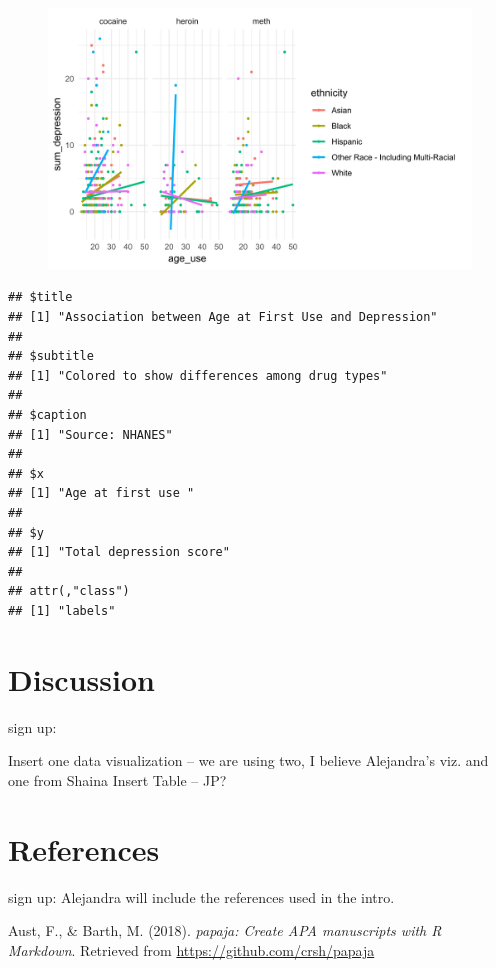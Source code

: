 \documentclass[man]{apa6}
\begin{document}
\begin{figure}
\centering
\includegraphics{Final_Paper_Group_3_files/figure-latex/ST_plot1-1.svg}
\caption{}
\end{figure}

\begin{verbatim}
## $title
## [1] "Association between Age at First Use and Depression"
## 
## $subtitle
## [1] "Colored to show differences among drug types"
## 
## $caption
## [1] "Source: NHANES"
## 
## $x
## [1] "Age at first use "
## 
## $y
## [1] "Total depression score"
## 
## attr(,"class")
## [1] "labels"
\end{verbatim}

\section{Discussion}\label{discussion}

sign up:

Insert one data visualization -- we are using two, I believe Alejandra's
viz. and one from Shaina Insert Table -- JP?

\newpage

\section{References}\label{references}

sign up: Alejandra will include the references used in the intro.

\begingroup
\setlength{\parindent}{-0.5in} \setlength{\leftskip}{0.5in}

\hypertarget{refs}{}
\hypertarget{ref-R-papaja}{}
Aust, F., \& Barth, M. (2018). \emph{papaja: Create APA manuscripts with
R Markdown}. Retrieved from \url{https://github.com/crsh/papaja}
\end{document}
